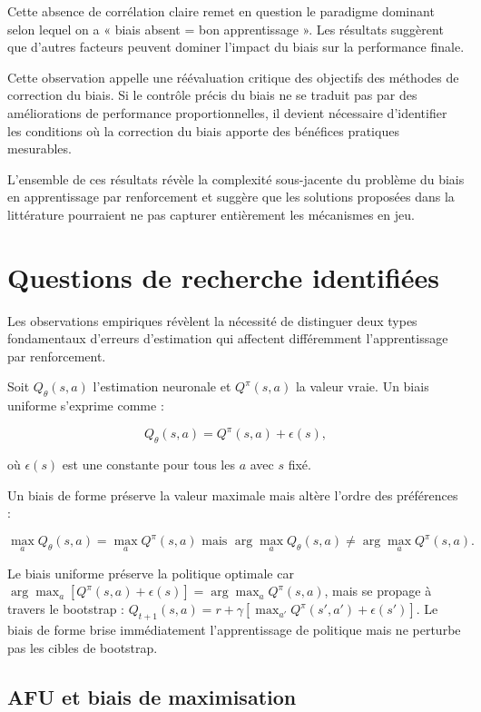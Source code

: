 \documentclass[a4paper, 12pt]{report}
\begin{document}
    Cette absence de corrélation claire remet en question le paradigme dominant
    selon lequel on a « biais absent = bon apprentissage ». Les résultats
    suggèrent que d'autres facteurs peuvent dominer l'impact du biais sur la
    performance finale.

    Cette observation appelle une réévaluation critique des objectifs des
    méthodes de correction du biais. Si le contrôle précis du biais ne se
    traduit pas par des améliorations de performance proportionnelles, il
    devient nécessaire d'identifier les conditions où la correction du biais
    apporte des bénéfices pratiques mesurables.

    L'ensemble de ces résultats révèle la complexité sous-jacente du problème
    du biais en apprentissage par renforcement et suggère que les solutions
    proposées dans la littérature pourraient ne pas capturer entièrement les
    mécanismes en jeu.

    \section{Questions de recherche identifiées}

    Les observations empiriques révèlent la nécessité de distinguer deux types
    fondamentaux d'erreurs d'estimation qui affectent différemment
    l'apprentissage par renforcement.

    Soit $Q_\theta(s,a)$ l'estimation neuronale et $Q^\pi(s,a)$ la valeur
    vraie. Un biais uniforme s'exprime comme :

    $$
    Q_\theta(s,a) = Q^\pi(s,a) + \epsilon(s),
    $$

    où $\epsilon(s)$ est une constante pour tous les $a$ avec $s$ fixé.

    Un biais de forme préserve la valeur maximale mais altère l'ordre des
    préférences :

  $$\max_a Q_\theta(s,a) = \max_a Q^\pi(s,a) \text{ mais } \arg\max_a Q_\theta(s,a) \neq \arg\max_a Q^\pi(s,a).$$


    Le biais uniforme préserve la politique optimale car $\arg\max_a
    [Q^\pi(s,a) + \epsilon(s)] = \arg\max_a Q^\pi(s,a)$, mais se propage à
    travers le bootstrap : $Q_{t+1}(s,a) = r + \gamma[\max_{a'} Q^\pi(s',a') +
    \epsilon(s')]$. Le biais de forme brise immédiatement l'apprentissage de
    politique mais ne perturbe pas les cibles de bootstrap.

    \subsection{AFU et biais de maximisation}
\end{document}

